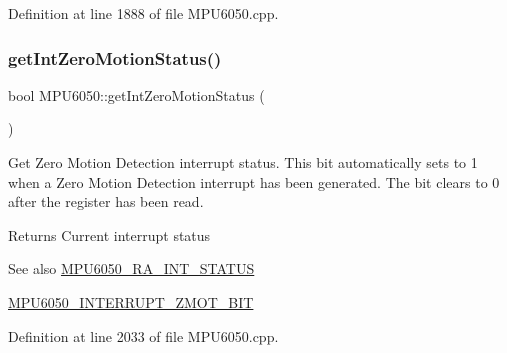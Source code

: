 Definition at line 1888 of file M\+P\+U6050.\+cpp.


\begin{DoxyCode}{0}

\end{DoxyCode}
\mbox{\label{classMPU6050_afa73a5ffdc423736ae88702a469ba3a0}} 
\subsubsection{\texorpdfstring{getIntZeroMotionStatus()}{getIntZeroMotionStatus()}}
{\footnotesize\ttfamily bool M\+P\+U6050\+::get\+Int\+Zero\+Motion\+Status (\begin{DoxyParamCaption}{ }\end{DoxyParamCaption})}

Get Zero Motion Detection interrupt status. This bit automatically sets to 1 when a Zero Motion Detection interrupt has been generated. The bit clears to 0 after the register has been read. \begin{DoxyReturn}{Returns}
Current interrupt status 
\end{DoxyReturn}
\begin{DoxySeeAlso}{See also}
\mbox{\hyperlink{MPU6050_8h_a8337320c5ccc92def830e968d2e19d75}{M\+P\+U6050\+\_\+\+R\+A\+\_\+\+I\+N\+T\+\_\+\+S\+T\+A\+T\+US}} 

\mbox{\hyperlink{MPU6050_8h_aa4a24f325b4449adf83ce8458bb31a08}{M\+P\+U6050\+\_\+\+I\+N\+T\+E\+R\+R\+U\+P\+T\+\_\+\+Z\+M\+O\+T\+\_\+\+B\+IT}} 
\end{DoxySeeAlso}


Definition at line 2033 of file M\+P\+U6050.\+cpp.


